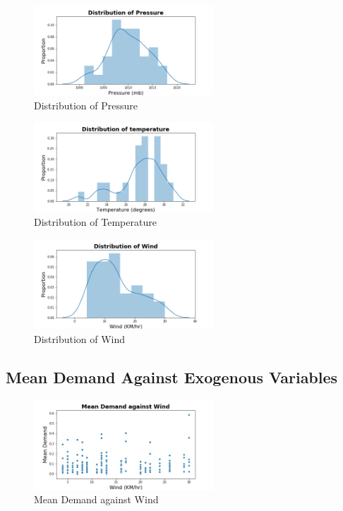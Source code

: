 \documentclass[12pt, letterpaper] {article}
\begin{document}
\begin{figure}[H]
    \centering
    \includegraphics[width=0.6\textwidth, height=0.3\textheight]{Images/distplot_pressure.png}
    \caption{Distribution of Pressure}
    \label{fig:Distribution of Pressure}
\end{figure}

\begin{figure}[H]
    \centering
    \includegraphics[width=0.6\textwidth, height=0.3\textheight]{Images/distplot_temp.png}
    \caption{Distribution of Temperature}
    \label{fig:Distribution of Temperature}
\end{figure}

\begin{figure}[H]
    \centering
    \includegraphics[width=0.6\textwidth, height=0.3\textheight]{Images/distplot_wind.png}
    \caption{Distribution of Wind}
    \label{fig:Distribution of Wind}
\end{figure}

\subsection{Mean Demand Against Exogenous Variables}

\begin{figure}[H]
    \centering
    \includegraphics[width=0.6\textwidth, height=0.3\textheight]{Images/wind_mean_demand.jpg}
    \caption{Mean Demand against Wind}
    \label{fig:Mean Demand against Wind}
\end{figure}
\end{document}
